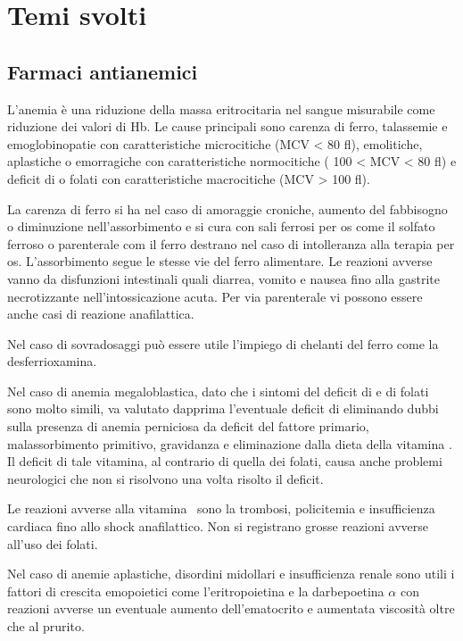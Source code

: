 \chapter{Temi svolti}

\section{Farmaci antianemici}

L'anemia è una riduzione della massa eritrocitaria nel sangue misurabile come riduzione dei valori di Hb. Le cause principali sono carenza di ferro, talassemie e emoglobinopatie con caratteristiche microcitiche (MCV < 80 fl), emolitiche, aplastiche o emorragiche con caratteristiche normocitiche ( 100 < MCV < 80 fl) e deficit di  o folati con caratteristiche macrocitiche (MCV > 100 fl).

La carenza di ferro si ha nel caso di amoraggie croniche, aumento del fabbisogno o diminuzione nell'assorbimento e si cura con sali ferrosi per os come il solfato ferroso o parenterale com il ferro destrano nel caso di intolleranza alla terapia per os. L'assorbimento segue le stesse vie del ferro alimentare. Le reazioni avverse vanno da disfunzioni intestinali quali diarrea, vomito e nausea fino alla gastrite necrotizzante nell'intossicazione acuta. Per via parenterale vi possono essere anche casi di reazione anafilattica.

Nel caso di sovradosaggi può essere utile l'impiego di chelanti del ferro come la desferrioxamina.

Nel caso di anemia megaloblastica, dato che i sintomi del deficit di  e di folati sono molto simili, va valutato dapprima l'eventuale deficit di  eliminando dubbi sulla presenza di anemia perniciosa da deficit del fattore primario, malassorbimento primitivo, gravidanza e eliminazione dalla dieta della vitamina . Il deficit di tale vitamina, al contrario di quella dei folati, causa anche problemi neurologici che non si risolvono una volta risolto il deficit.

Le reazioni avverse alla vitamina~ sono la trombosi, policitemia e insufficienza cardiaca fino allo shock anafilattico. Non si registrano grosse reazioni avverse all'uso dei folati.

Nel caso di anemie aplastiche, disordini midollari e insufficienza renale sono utili i fattori di crescita emopoietici come l'eritropoietina e la darbepoetina $\alpha$ con reazioni avverse un eventuale aumento dell'ematocrito e aumentata viscosità oltre che al prurito.

